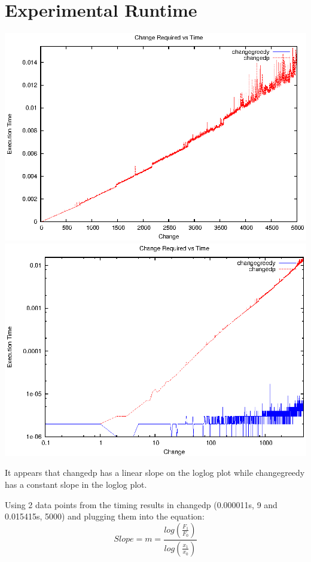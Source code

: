 \documentclass[letterpaper,10pt,titlepage]{article}
\begin{document}
\section{Experimental Runtime}
\includegraphics[width=\textwidth]{graph2-normal.eps}
\includegraphics[width=\textwidth]{graph2-log.eps}

It appears that changedp has a linear slope on the loglog plot while changegreedy has a constant slope in the loglog plot.

Using 2 data points from the timing results in changedp (0.000011s, 9 and 0.015415s, 5000) and plugging them into the equation:
\begin{equation}\label{eq:Slope}
Slope = m = \frac{log(\frac{F_{1}}{F_{0}})}{log(\frac{x_{1}}{x_{0}})}
\end{equation}
\end{document}
